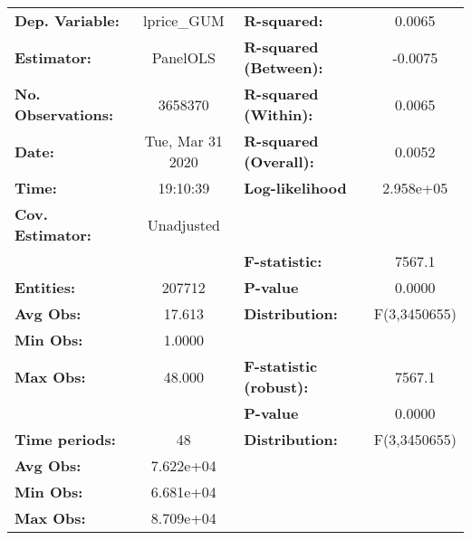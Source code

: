 \documentclass{report}
\begin{document}
\begin{center}
\begin{tabular}{lclc}
\toprule
\textbf{Dep. Variable:}       &    lprice\_GUM     & \textbf{  R-squared:         }   &      0.0065      \\
\textbf{Estimator:}           &      PanelOLS      & \textbf{  R-squared (Between):}  &     -0.0075      \\
\textbf{No. Observations:}    &      3658370       & \textbf{  R-squared (Within):}   &      0.0065      \\
\textbf{Date:}                &  Tue, Mar 31 2020  & \textbf{  R-squared (Overall):}  &      0.0052      \\
\textbf{Time:}                &      19:10:39      & \textbf{  Log-likelihood     }   &    2.958e+05     \\
\textbf{Cov. Estimator:}      &     Unadjusted     & \textbf{                     }   &                  \\
\textbf{}                     &                    & \textbf{  F-statistic:       }   &      7567.1      \\
\textbf{Entities:}            &       207712       & \textbf{  P-value            }   &      0.0000      \\
\textbf{Avg Obs:}             &       17.613       & \textbf{  Distribution:      }   &   F(3,3450655)   \\
\textbf{Min Obs:}             &       1.0000       & \textbf{                     }   &                  \\
\textbf{Max Obs:}             &       48.000       & \textbf{  F-statistic (robust):} &      7567.1      \\
\textbf{}                     &                    & \textbf{  P-value            }   &      0.0000      \\
\textbf{Time periods:}        &         48         & \textbf{  Distribution:      }   &   F(3,3450655)   \\
\textbf{Avg Obs:}             &     7.622e+04      & \textbf{                     }   &                  \\
\textbf{Min Obs:}             &     6.681e+04      & \textbf{                     }   &                  \\
\textbf{Max Obs:}             &     8.709e+04      & \textbf{                     }   &                  \\
\bottomrule
\end{tabular}
\begin{tabular}{lcccccc}

\end{tabular}
\end{center}
\end{document}
